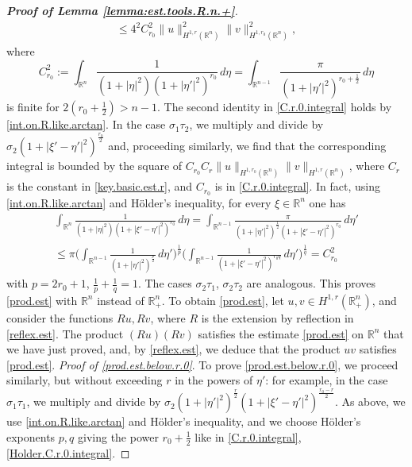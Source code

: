 \documentclass[10pt,reqno,a4paper]{article}
\numberwithin{equation}{section}
\theoremstyle{plain}
\theoremstyle{definition}
\newcommand{\R}{{\mathbb R}}
\begin{document}
\begin{proof}[\textbf{Proof of Lemma \ref{lemma:est.tools.R.n.+}}]
\begin{align*}
\leq 4^2 C_{r_0}^2 \| u \|_{H^{1,r}(\R^n)}^2 \| v \|_{H^{1,r_0}(\R^n)}^2, 
\end{align*}
where 
\begin{equation} \label{C.r.0.integral}
C_{r_0}^2 := \int_{\R^n} \frac{1}{ (1 + |\eta|^2)(1 + |\eta'|^2)^{r_0} } \, d\eta 
= \int_{\R^{n-1}} \frac{\pi}{ (1 + |\eta'|^2)^{r_0 + \frac12} } \, d\eta 
\end{equation}
is finite for $2 (r_0 + \frac12) > n-1$. 
The second identity in \eqref{C.r.0.integral} holds by \eqref{int.on.R.like.arctan}. 
In the case $\sigma_1 \tau_2$, we multiply and divide by 
$\sigma_2 (1 + |\xi' - \eta'|^2)^{\frac{r_0}{2}}$ and, proceeding similarly,  
we find that the corresponding integral is bounded by 
the square of $C_{r_0} C_r \| u \|_{H^{1,r_0}(\R^n)} \| v \|_{H^{1,r}(\R^n)}$, 
where $C_r$ is the constant in \eqref{key.basic.est.r}, 
and $C_{r_0}$ is in \eqref{C.r.0.integral}. 
In fact, using \eqref{int.on.R.like.arctan} and H\"older's inequality, 
for every $\xi \in \R^n$ one has 
\begin{multline}
\int_{\R^n} \frac{1}{ (1 + |\eta|^2)(1 + |\xi' - \eta'|^2)^{r_0} } \, d\eta 
= \int_{\R^{n-1}} \frac{\pi}{ (1 + |\eta'|^2)^{\frac12} (1 + |\xi' - \eta'|^2)^{r_0} } \, d\eta' 
\\
\leq \pi \Big( \int_{\R^{n-1}} \frac{1}{ (1 + |\eta'|^2)^{\frac{p}{2}} } \, d \eta' \Big)^{\frac{1}{p}} 
\Big( \int_{\R^{n-1}} \frac{1}{ (1 + |\xi' - \eta'|^2)^{r_0 q} } \, d\eta' \Big)^{\frac{1}{q}}
= C_{r_0}^2 
\label{Holder.C.r.0.integral}
\end{multline} 
with $p = 2 r_0 + 1$, $\frac{1}{p} + \frac{1}{q} = 1$.
The cases $\sigma_2 \tau_1$, $\sigma_2 \tau_2$ are analogous. 
This proves \eqref{prod.est} with $\R^n$ instead of $\R^n_+$. 
To obtain \eqref{prod.est}, let $u, v \in H^{1,r}(\R^n_+)$, 
and consider the functions $R u, R v$, where $R$ is the 
extension by reflection in \eqref{reflex.est}. 
The product $(Ru)(Rv)$ satisfies the estimate \eqref{prod.est} on $\R^n$ 
that we have just proved, and, by \eqref{reflex.est}, 
we deduce that the product $uv$ satisfies \eqref{prod.est}. 
\emph{Proof of \eqref{prod.est.below.r.0}}.
To prove \eqref{prod.est.below.r.0}, we proceed similarly, but without exceeding $r$ 
in the powers of $\eta'$: for example, in the case $\sigma_1 \tau_1$, 
we multiply and divide by 
$\sigma_2 (1 + |\eta'|^2)^{\frac{r}{2}} (1 + |\xi'-\eta'|^2)^{\frac{r_0 - r}{2}}$. 
As above, we use \eqref{int.on.R.like.arctan} and H\"older's inequality, 
and we choose H\"older's exponents $p,q$ giving the power $r_0+\frac12$ 
like in \eqref{C.r.0.integral}, \eqref{Holder.C.r.0.integral}. 


\end{proof}
\end{document}
